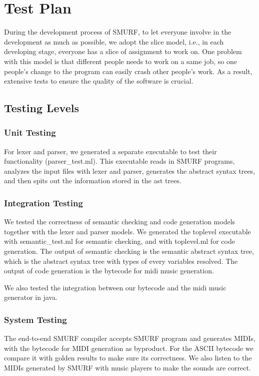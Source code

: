 \section{Test Plan}

During the development process of SMURF, to let everyone involve in the development as much as possible, we adopt the slice model, 
i.e., in each developing stage, everyone has a slice of assignment to work on.
One problem with this model is that different people needs to work on a same job, 
so one people's change to the program can easily crash other people's work. 
As a result, extensive tests to ensure the quality of the software is crucial. 

\subsection{Testing Levels}
\subsubsection{Unit Testing}
For lexer and parser, we generated a separate executable to test their functionality (parser_test.ml). 
This executable reads in SMURF programs, analyzes the input files with lexer and parser, generates the abstract syntax trees, 
 and then spits out the information stored in the ast trees.

\subsubsection{Integration Testing}
We tested the correctness of semantic checking and code generation models together with the lexer and parser models.
We generated the toplevel executable with semantic_test.ml for semantic checking, and with toplevel.ml for code generation. 
The output of semantic checking is the semantic abstract syntax tree, 
which is the abstract syntax tree with types of every variables resolved.
The output of code generation is the bytecode for midi music generation.

We also tested the integration between our bytecode and the midi music generator in java.

\subsubsection{System Testing}
The end-to-end SMURF compiler accepts SMURF program and generates MIDIs, with the bytecode for MIDI generation as byproduct.
For the ASCII bytecode we compare it with golden results to make sure its correctness. 
We also listen to the MIDIs generated by SMURF with music players to make the sounds are correct.

